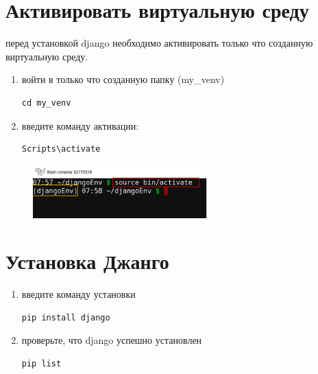 \documentclass[12pt]{article}
\begin{document}
\section{Активировать виртуальную среду}
перед установкой django необходимо активировать только что созданную виртуальную среду.
\begin{enumerate}
	\item войти в только что созданную папку (my\_venv)

	      \begin{lstlisting}[caption=\phantom{},style=conlst,label={lst:create_venv}]
cd my_venv
			\end{lstlisting}

	\item введите команду активации:

	      \begin{lstlisting}[caption=\phantom{},style=conlst,label={lst:create_venv}]
Scripts\activate
			\end{lstlisting}

\end{enumerate}

\begin{figure}[H]
	\centering
	\includegraphics[width =0.6\textwidth ,keepaspectratio]{imgs/activate_venv.png}
	\caption{}
\end{figure}

\section{Установка Джанго}

\begin{enumerate}
	\item введите команду установки

	      \begin{lstlisting}[caption=\phantom{},style=conlst,label={lst:create_venv}]
pip install django
			\end{lstlisting}

	\item проверьте, что django успешно установлен

	      \begin{lstlisting}[caption=\phantom{},style=conlst,label={lst:create_venv}]
pip list
			\end{lstlisting}

\end{enumerate}
\end{document}
